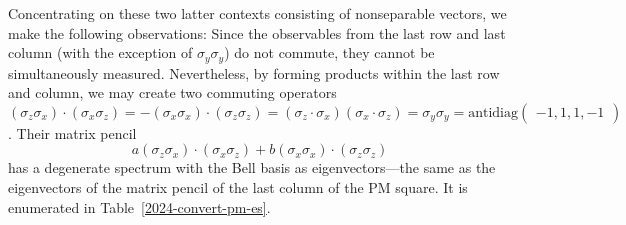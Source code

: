 \documentclass[
  twocolumn,
 showpacs,
 showkeys,
 preprintnumbers,
 amsmath,amssymb,
 aps,
 prl,
  longbibliography,
 floatfix,
 ]{revtex4-2}
\newcommand\myotimes{ }
\begin{document}
Concentrating on these two latter contexts consisting of nonseparable vectors, we make the following observations:
Since the observables from the last row and last column (with the exception of  $\sigma_y \myotimes \sigma_y$) do not commute, they cannot be simultaneously measured.
Nevertheless, by forming products within the last row and column, we may create two commuting operators
%
%
$
(\sigma_z \myotimes \sigma_x) \cdot (\sigma_x \myotimes \sigma_z) = -(\sigma_x \myotimes \sigma_x) \cdot (\sigma_z \myotimes \sigma_z)
=
(\sigma_z \cdot \sigma_x ) \myotimes (\sigma_x \cdot \sigma_z)
=   \sigma_y  \myotimes \sigma_y
= \text{antidiag}
\begin{pmatrix} -1 , 1 ,1, -1
\end{pmatrix}
$.
Their matrix pencil
\begin{equation}
a(\sigma_z \myotimes \sigma_x) \cdot (\sigma_x \myotimes \sigma_z) + b (\sigma_x \myotimes \sigma_x) \cdot (\sigma_z \myotimes \sigma_z)
\label{2024-convert-mppm}
\end{equation}
has a degenerate spectrum with the Bell basis as eigenvectors---the same as the eigenvectors of the matrix pencil of the last column of the PM square. It is enumerated in Table~\ref{2024-convert-pm-es}.
\end{document}
